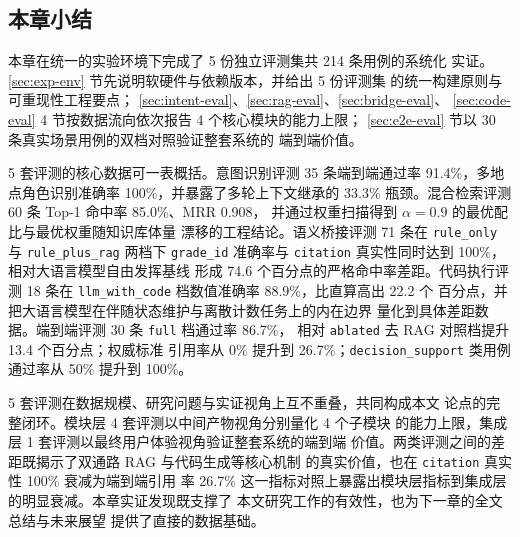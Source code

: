 \documentclass[a4paper]{article}
\theoremstyle{definition}
\theoremstyle{plain}
\theoremstyle{remark}
\newcommand{\bk}{\discretionary{}{}{}}
\begin{document}

\subsection{本章小结}
\label{sec:eval-summary}

本章在统一的实验环境下完成了 5 份独立评测集共 214 条用例的系统化
实证。\ref{sec:exp-env} 节先说明软硬件与依赖版本，并给出 5 份评测集
的统一构建原则与可重现性工程要点；
\ref{sec:intent-eval}、\ref{sec:rag-eval}、\ref{sec:bridge-eval}、
\ref{sec:code-eval} 4 节按数据流向依次报告 4 个核心模块的能力上限；
\ref{sec:e2e-eval} 节以 30 条真实场景用例的双档对照验证整套系统的
端到端价值。

5 套评测的核心数据可一表概括。意图识别评测 35 条端到端通过率
91.4\%，多地点角色识别准确率 100\%，并暴露了多轮上下文继承的
33.3\% 瓶颈。混合检索评测 60 条 Top-1 命中率 85.0\%、MRR 0.908，
并通过权重扫描得到 $\alpha=0.9$ 的最优配比与最优权重随知识库体量
漂移的工程结论。语义桥接评测 71 条在 \texttt{rule\_\bk{}only} 与
\texttt{rule\_\bk{}plus\_\bk{}rag} 两档下 \texttt{grade\_\bk{}id} 准确率与
\texttt{citation} 真实性同时达到 100\%，相对大语言模型自由发挥基线
形成 74.6 个百分点的严格命中率差距。代码执行评测 18 条在
\texttt{llm\_\bk{}with\_\bk{}code} 档数值准确率 88.9\%，比直算高出 22.2 个
百分点，并把大语言模型在伴随状态维护与离散计数任务上的内在边界
量化到具体差距数据。端到端评测 30 条 \texttt{full} 档通过率 86.7\%，
相对 \texttt{ablated} 去 RAG 对照档提升 13.4 个百分点；权威标准
引用率从 0\% 提升到 26.7\%；\texttt{decision\_\bk{}support} 类用例
通过率从 50\% 提升到 100\%。

5 套评测在数据规模、研究问题与实证视角上互不重叠，共同构成本文
论点的完整闭环。模块层 4 套评测以中间产物视角分别量化 4 个子模块
的能力上限，集成层 1 套评测以最终用户体验视角验证整套系统的端到端
价值。两类评测之间的差距既揭示了双通路 RAG 与代码生成等核心机制
的真实价值，也在 \texttt{citation} 真实性 100\% 衰减为端到端引用
率 26.7\% 这一指标对照上暴露出模块层指标到集成层的明显衰减。本章实证发现既支撑了
本文研究工作的有效性，也为下一章的全文总结与未来展望
提供了直接的数据基础。
\end{document}
